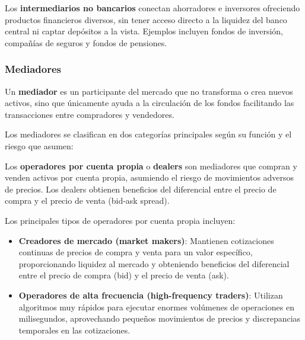 \begin{definicion}
Los \textbf{intermediarios no bancarios} conectan ahorradores e inversores ofreciendo productos financieros diversos, sin tener acceso directo a la liquidez del banco central ni captar depósitos a la vista. Ejemplos incluyen fondos de inversión, compañías de seguros y fondos de pensiones.
\end{definicion}

\subsubsection{Mediadores}

\begin{definicion}[Mediador]
Un \textbf{mediador} es un participante del mercado que no transforma o crea nuevos activos, sino que únicamente ayuda a la circulación de los fondos facilitando las transacciones entre compradores y vendedores.
\end{definicion}

Los mediadores se clasifican en dos categorías principales según su función y el riesgo que asumen:

\begin{definicion}
Los \textbf{operadores por cuenta propia} o \textbf{dealers} son mediadores que compran y venden activos por cuenta propia, asumiendo el riesgo de movimientos adversos de precios. Los dealers obtienen beneficios del diferencial entre el precio de compra y el precio de venta (bid-ask spread).
\end{definicion}

Los principales tipos de operadores por cuenta propia incluyen:

\begin{itemize}
\item \textbf{Creadores de mercado (market makers)}: Mantienen cotizaciones continuas de precios de compra y venta para un valor específico, proporcionando liquidez al mercado y obteniendo beneficios del diferencial entre el precio de compra (bid) y el precio de venta (ask).

\item \textbf{Operadores de alta frecuencia (high-frequency traders)}: Utilizan algoritmos muy rápidos para ejecutar enormes volúmenes de operaciones en milisegundos, aprovechando pequeños movimientos de precios y discrepancias temporales en las cotizaciones.
\end{itemize}


